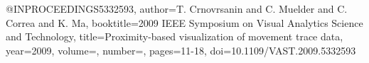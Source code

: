 @INPROCEEDINGS{5332593,
  author={T. {Crnovrsanin} and C. {Muelder} and C. {Correa} and K. {Ma}},
  booktitle={2009 IEEE Symposium on Visual Analytics Science and Technology}, 
  title={Proximity-based visualization of movement trace data}, 
  year={2009},
  volume={},
  number={},
  pages={11-18},
  doi={10.1109/VAST.2009.5332593}}